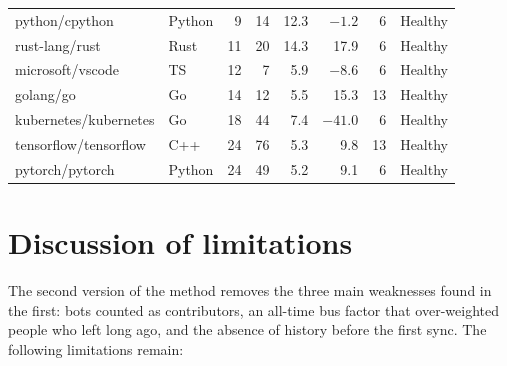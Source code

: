 \documentclass[11pt,a4paper]{report}
\newcommand{\risk}[1]{\textsf{\small #1}}
\begin{document}
\begin{small}
\begin{longtable}{l l r r r r r l}
python/cpython & Python & 9 & 14 & 12.3 & $-1.2$ & 6 & \risk{Healthy} \\
rust-lang/rust & Rust & 11 & 20 & 14.3 & 17.9 & 6 & \risk{Healthy} \\
microsoft/vscode & TS & 12 & 7 & 5.9 & $-8.6$ & 6 & \risk{Healthy} \\
golang/go & Go & 14 & 12 & 5.5 & 15.3 & 13 & \risk{Healthy} \\
kubernetes/kubernetes & Go & 18 & 44 & 7.4 & $-41.0$ & 6 & \risk{Healthy} \\
tensorflow/tensorflow & C++ & 24 & 76 & 5.3 & 9.8 & 13 & \risk{Healthy} \\
pytorch/pytorch & Python & 24 & 49 & 5.2 & 9.1 & 6 & \risk{Healthy} \\
\end{longtable}
\end{small}
\vspace{-1em}

\section{Discussion of limitations}

The second version of the method removes the three main weaknesses found in
the first: bots counted as contributors, an all-time bus factor that
over-weighted people who left long ago, and the absence of history before the
first sync. The following limitations remain:
\end{document}
